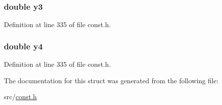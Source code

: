 \subsubsection[{y3}]{\setlength{\rightskip}{0pt plus 5cm}double y3}\label{structcondsq_a786634d3d364cf94d8eb600ce7136355}


Definition at line 335 of file const.\+h.

\hypertarget{structcondsq_aa27494b0c52727c9b56afe76f9aff13f}{}
\subsubsection[{y4}]{\setlength{\rightskip}{0pt plus 5cm}double y4}\label{structcondsq_aa27494b0c52727c9b56afe76f9aff13f}


Definition at line 335 of file const.\+h.



The documentation for this struct was generated from the following file\+:\begin{DoxyCompactItemize}
\item 
src/\hyperlink{const_8h}{const.\+h}\end{DoxyCompactItemize}

